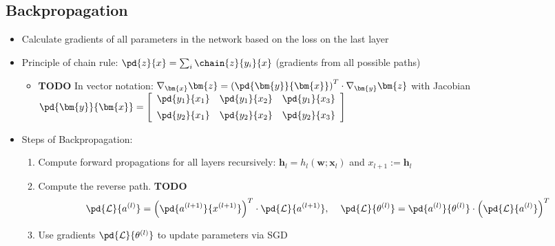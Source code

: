 \subsection{Backpropagation}
\begin{itemize}
	\item Calculate gradients of all parameters in the network based on the loss on the last layer
	\item Principle of chain rule: $\pd{z}{x} = \sum_i \chain{z}{y_i}{x}$ (gradients from all possible paths)
	\begin{itemize}
		\item \textbf{TODO} In vector notation: $\nabla_{\bm{x}} \bm{z} = \left(\pd{\bm{y}}{\bm{x}}\right)^T \cdot \nabla_{\bm{y}} \bm{z}$ with Jacobian $\pd{\bm{y}}{\bm{x}} = \left[\begin{array}{ccc}
		\pd{y_1}{x_1} & \pd{y_1}{x_2} & \pd{y_1}{x_3} \\[5pt]
		\pd{y_2}{x_1} & \pd{y_2}{x_2} & \pd{y_2}{x_3} \\
		\end{array}\right]$
	\end{itemize}
	\item Steps of Backpropagation:
	\begin{enumerate}
		\item Compute forward propagations for all layers recursively:
		$\mathbf{h}_l = h_l(\mathbf{w};\mathbf{x}_l)$ and $x_{l+1} := \mathbf{h}_l$
		\item Compute the reverse path. 
		\textbf{TODO} $$\pd{\mathcal{L}}{a^{(l)}} = \left(\pd{a^{(l+1)}}{x^{(l+1)}}\right)^T \cdot \pd{\mathcal{L}}{a^{(l+1)}}, \hspace{4mm} \pd{\mathcal{L}}{\theta^{(l)}} = \pd{a^{(l)}}{\theta^{(l)}} \cdot \left(\pd{\mathcal{L}}{a^{(l)}}\right)^T$$
		\item Use gradients $\pd{\mathcal{L}}{\theta^{(l)}}$ to update parameters via SGD
	\end{enumerate}
\end{itemize}